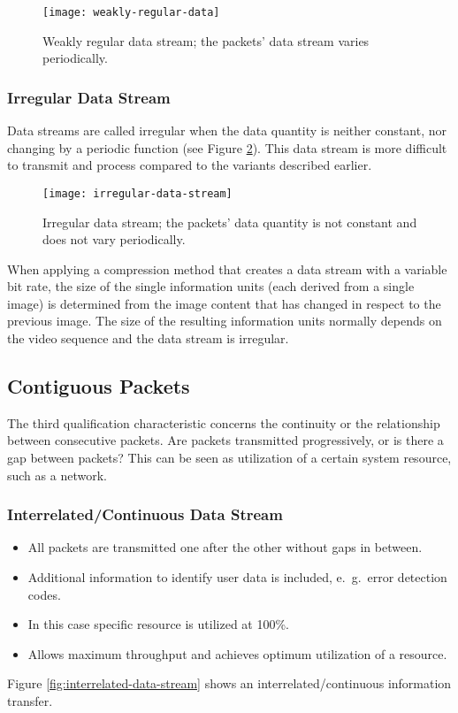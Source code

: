 	\begin{figure}[ht]
		\centering
		\texttt{[image: weakly-regular-data]}
		\caption[Weakly regular data stream]{Weakly regular data stream; the packets’ data stream varies periodically.}\label{fig:weakly-regular-data-stream}
	\end{figure}
	
\subsubsection{Irregular Data Stream}
Data streams are called irregular when the data quantity is neither constant, nor
changing by a periodic function (see Figure {\ref{fig:irregular-data-stream}}). This data stream is more difficult to transmit and process compared to the variants described earlier.

\begin{figure}[hb]
	\centering
	\texttt{[image: irregular-data-stream]}
	\caption[Irregular data stream]{Irregular data stream; the packets’ data quantity is not constant and does not vary periodically.}\label{fig:irregular-data-stream}
\end{figure}


When applying a compression method that creates a data stream with a variable
bit rate, the size of the single information units (each derived from a single image) is determined from the image content that has changed in respect to the previous image.
The size of the resulting information units normally depends on the video sequence and
the data stream is irregular.

\subsection{Contiguous Packets}
The third qualification characteristic concerns the continuity or the relationship
between consecutive packets. Are packets transmitted progressively, or is there a gap
between packets?  This can be seen as utilization of a certain system resource, such as a network.

\subsubsection{Interrelated/Continuous Data Stream}
\begin{itemize}
	\item All packets are transmitted one after the other without gaps in between.
	\item Additional information to identify user data is included, e.\ g.\, error detection codes.
	\item In this case specific resource is utilized at 100\%.
	\item Allows maximum throughput and achieves optimum utilization of a resource.
\end{itemize}
Figure {\ref{fig:interrelated-data-stream}} shows an interrelated/continuous information transfer.

